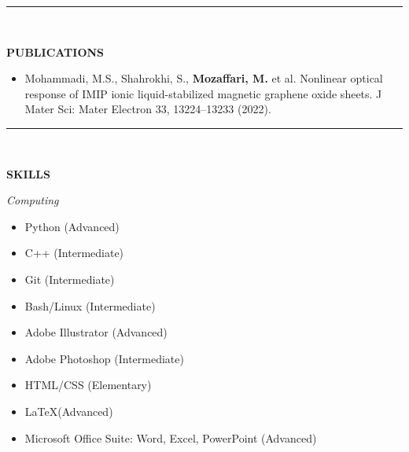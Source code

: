 \documentclass[12pt, b4paper]{cv}
\begin{document}
\vspace{-0.15in}
\rule{\textwidth}{1pt}\\
\vspace{-0.15in}

{\Large \textbf{PUBLICATIONS}}
\vspace{-5pt}

\begin{itemize}
	\item Mohammadi, M.S., Shahrokhi, S., \textbf{Mozaffari, M.} et al. Nonlinear optical response of IMIP ionic liquid-stabilized magnetic graphene oxide sheets. J Mater Sci: Mater Electron 33, 13224–13233 (2022).
\end{itemize}

\pagebreak




\vspace{-0.15in}
\rule{\textwidth}{1pt}\\
\vspace{-0.15in}


{\Large \textbf{SKILLS}}
\vspace{5pt}

\textit{Computing}

\begin{multicols}{3}[]
	\begin{itemize}
	\setlength\itemsep{-0.5pt}
	  \item  Python (Advanced)
	  \item  C++ (Intermediate)
	  \item  Git (Intermediate)
	  \item  Bash/Linux (Intermediate)
	  \item  Adobe Illustrator (Advanced)
	  \item  Adobe Photoshop (Intermediate)
	  \item  HTML/CSS (Elementary)
	  \item  \LaTeX  (Advanced)
	  \item  Microsoft Office Suite: Word, Excel, PowerPoint (Advanced)
	\end{itemize}
\end{multicols}
\end{document}
